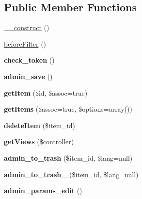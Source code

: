 \subsection*{\-Public \-Member \-Functions}
\begin{DoxyCompactItemize}
\item 
\hyperlink{class_app_controller_ad883ad87afd78ad9a8f70416d1f9471e}{\-\_\-\-\_\-construct} ()
\item 
\hyperlink{class_app_controller_ae6932ff72664b2b2a7f0bffc3e7f9bc7}{before\-Filter} ()
\item 
\hypertarget{class_app_controller_ab11a05e10d035c3609fdb0efd218b6d4}{
{\bfseries check\-\_\-token} ()}
\label{class_app_controller_ab11a05e10d035c3609fdb0efd218b6d4}

\item 
\hypertarget{class_app_controller_a9c9b946429fb62af1c94bf31899f3395}{
{\bfseries admin\-\_\-save} ()}
\label{class_app_controller_a9c9b946429fb62af1c94bf31899f3395}

\item 
\hypertarget{class_app_controller_aa846b9844b6975d34d3f194f4b9ea14c}{
{\bfseries get\-Item} (\$id, \$assoc=true)}
\label{class_app_controller_aa846b9844b6975d34d3f194f4b9ea14c}

\item 
\hypertarget{class_app_controller_a6edf3d647292fb67a48e5f0e850353d5}{
{\bfseries get\-Items} (\$assoc=true, \$options=array())}
\label{class_app_controller_a6edf3d647292fb67a48e5f0e850353d5}

\item 
\hypertarget{class_app_controller_aea5a6426390bb3c855460962b5b6ef81}{
{\bfseries delete\-Item} (\$item\-\_\-id)}
\label{class_app_controller_aea5a6426390bb3c855460962b5b6ef81}

\item 
\hypertarget{class_app_controller_a4a98d0e4b2f49cf833a96cfb5fa981ed}{
{\bfseries get\-Views} (\$controller)}
\label{class_app_controller_a4a98d0e4b2f49cf833a96cfb5fa981ed}

\item 
\hypertarget{class_app_controller_a4c3fe84549c5925b54c0e290c9276064}{
{\bfseries admin\-\_\-to\-\_\-trash} (\$item\-\_\-id, \$lang=null)}
\label{class_app_controller_a4c3fe84549c5925b54c0e290c9276064}

\item 
\hypertarget{class_app_controller_a622c6741bfb65826af7bf42811d923af}{
{\bfseries admin\-\_\-to\-\_\-trash\-\_\-} (\$item\-\_\-id, \$lang=null)}
\label{class_app_controller_a622c6741bfb65826af7bf42811d923af}

\item 
\hypertarget{class_app_controller_aa09728c83a04669a8b36ad489babf466}{
{\bfseries admin\-\_\-params\-\_\-edit} ()}
\label{class_app_controller_aa09728c83a04669a8b36ad489babf466}

\end{DoxyCompactItemize}
